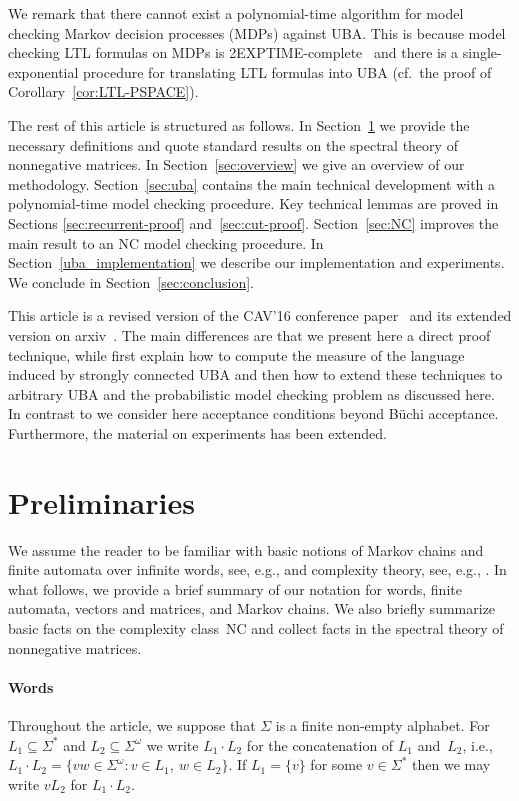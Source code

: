 \documentclass{elsarticle}
\begin{document}
We remark that there cannot exist a polynomial-time algorithm for model checking Markov decision processes (MDPs) against UBA.
This is because model checking LTL formulas on MDPs is 2EXPTIME-complete~\cite{CY95} and there is a single-exponential procedure for translating LTL formulas into UBA (cf.\ the proof of Corollary~\ref{cor:LTL-PSPACE}).

The rest of this article is structured as follows.
In Section~\ref{sec:prelim} we provide the necessary definitions and quote standard results on the spectral theory of nonnegative matrices.
In Section~\ref{sec:overview} we give an overview of our methodology.
Section~\ref{sec:uba} contains the main technical development with a polynomial-time model checking procedure.
Key technical lemmas are proved in Sections \ref{sec:recurrent-proof} and~\ref{sec:cut-proof}.
Section~\ref{sec:NC} improves the main result to an NC model checking procedure.
In Section~\ref{uba_implementation} we describe our implementation and experiments.
We conclude in Section~\ref{sec:conclusion}.

This article is a revised version of the CAV'16 conference
paper~\cite{BKKKMW16} and its extended version on
arxiv~\cite{cav16full}.  The main differences are that we present here
a direct proof technique, while \cite{BKKKMW16,cav16full} first
explain how to compute the measure of the language induced by strongly
connected UBA and then how to extend these techniques to arbitrary UBA
and the probabilistic model checking problem as discussed here.  In
contrast to \cite{BKKKMW16,cav16full} we consider here acceptance
conditions beyond B\"uchi acceptance.  Furthermore, the material on
experiments has been extended.

\section{Preliminaries}
\label{sec:prelim}

We assume the reader to be familiar with basic notions of Markov
chains and finite automata over infinite words, see, e.g., \cite{GraedelThomasWilke02,Kulkarni} and complexity theory, see, e.g., \cite{Pap94}.  In what follows, we
provide a brief summary of our notation for words, finite automata,
vectors and matrices, and Markov chains.
We also briefly summarize basic facts on the complexity class~NC and collect facts in the spectral theory of nonnegative matrices.

\paragraph*{Words}
Throughout the article, we suppose that $\Sigma$ is a finite non-empty alphabet.
For $L_1 \subseteq \Sigma^*$ and $L_2 \subseteq \Sigma^\omega$ we write $L_1 \cdot L_2$ for the concatenation of $L_1$ and~$L_2$, i.e., $L_1 \cdot L_2 = \{v w \in \Sigma^\omega: v \in L_1, \ w \in L_2\}$.
If $L_1 = \{v\}$ for some $v \in \Sigma^*$ then we may write $v L_2$ for $L_1 \cdot L_2$.
\end{document}
